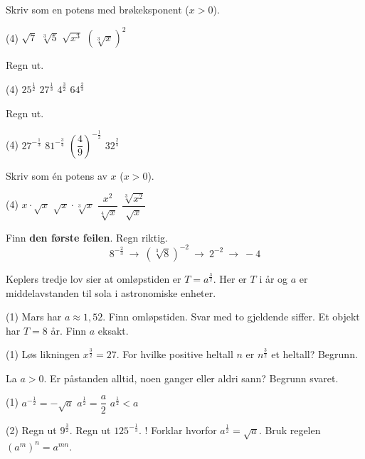 
Skriv som en potens med brøkeksponent ($x > 0$).
\begin{tasks}(4)
  \task $\sqrt{7}$
  \task $\sqrt[3]{5}$
  \task $\sqrt{x^3}$
  \task $\left(\sqrt[3]{x}\right)^2$
\end{tasks}

Regn ut.
\begin{tasks}(4)
  \task $25^{\tfrac12}$
  \task $27^{\tfrac13}$
  \task $4^{\tfrac32}$
  \task $64^{\tfrac23}$
\end{tasks}


Regn ut.
\begin{tasks}(4)
  \task $27^{-\tfrac13}$
  \task $81^{-\tfrac34}$
  \task $\left(\dfrac{4}{9}\right)^{-\tfrac12}$
  \task $32^{\tfrac25}$
\end{tasks}

Skriv som én potens av $x$ ($x > 0$).
\begin{tasks}(4)
  \task $x\cdot\sqrt{x}$
  \task $\sqrt{x}\cdot\sqrt[3]{x}$
  \task $\dfrac{x^2}{\sqrt[4]{x}}$
  \task $\dfrac{\sqrt[3]{x^2}}{\sqrt{x}}$
\end{tasks}

Finn \textbf{den første feilen}. Regn riktig.
\[ 8^{-\tfrac23} \ \to\ \left(\sqrt[3]{8}\right)^{-2} \ \to\ 2^{-2} \ \to\ -4 \]

Keplers tredje lov sier at omløpstiden er $T = a^{\tfrac32}$. Her er $T$ i år og $a$ er middelavstanden til sola i astronomiske enheter.
\begin{tasks}(1)
  \task Mars har $a \approx 1,52$. Finn omløpstiden. Svar med to gjeldende siffer.
  \task Et objekt har $T = 8$ år. Finn $a$ eksakt.
\end{tasks}


\begin{tasks}(1)
  \task Løs likningen $x^{\tfrac32} = 27$.
  \task For hvilke positive heltall $n$ er $n^{\tfrac32}$ et heltall? Begrunn.
\end{tasks}

La $a > 0$. Er påstanden alltid, noen ganger eller aldri sann? Begrunn svaret.
\begin{tasks}(1)
  \task $a^{-\tfrac12} = -\sqrt{a}$
  \task $a^{\tfrac12} = \dfrac{a}{2}$
  \task $a^{\tfrac12} < a$
\end{tasks}

\begin{sjekk}
\begin{tasks}(2)
  \task Regn ut $9^{\tfrac32}$.
  \task Regn ut $125^{-\tfrac13}$.
  \task! Forklar hvorfor $a^{\tfrac12} = \sqrt{a}$. Bruk regelen $(a^m)^n = a^{mn}$.
\end{tasks}
\end{sjekk}
